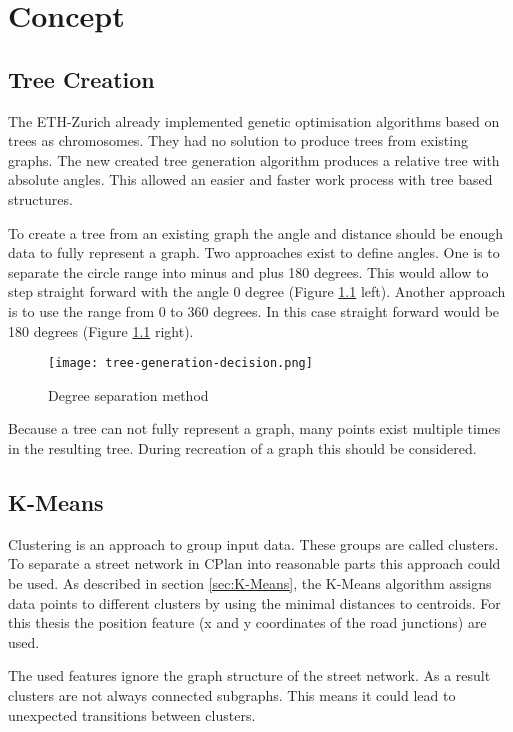 \chapter{Concept}
\section{Tree Creation}
\label{sec:tree_creation_angle}
The ETH-Zurich already implemented genetic optimisation algorithms based on trees as chromosomes. They had no solution to produce trees from existing graphs. The new created tree generation algorithm produces a relative tree with absolute angles. This allowed an easier and faster work process with tree based structures.

To create a tree from an existing graph the angle and distance should be enough data to fully represent a graph.
Two approaches exist to define angles. One is to separate the circle range into minus and plus 180 degrees. This would allow to step straight forward with the angle 0 degree (Figure \ref{fig:tree-generation-decision} left). Another approach is to use the range from 0 to 360 degrees. In this case straight forward would be 180 degrees (Figure \ref{fig:tree-generation-decision} right).

\begin{figure}[!ht]
    \centering
    \texttt{[image: tree-generation-decision.png]}
    \caption{Degree separation method \label{fig:tree-generation-decision}}
\end{figure}

Because a tree can not fully represent a graph, many points exist multiple times in the resulting tree. During recreation of a graph this should be considered.

\FloatBarrier
\pagebreak
\section{K-Means}
Clustering is an approach to group input data. These groups are called clusters. To separate a street network in CPlan into reasonable parts this approach could be used. As described in section \ref{sec:K-Means}, the K-Means algorithm assigns data points to different clusters by using the minimal distances to centroids. For this thesis the position feature (x and y coordinates of the road junctions) are used.

The used features ignore the graph structure of the street network. As a result clusters are not always connected subgraphs. This means it could lead to unexpected transitions between clusters.

